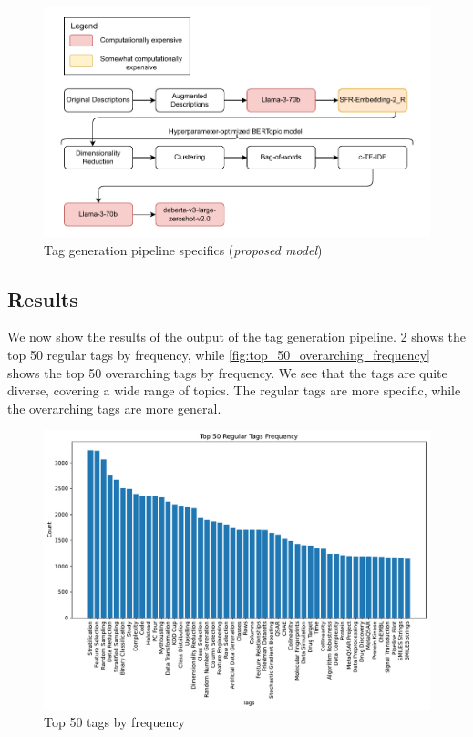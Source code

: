 \begin{figure}[h]
    \centering
    \includegraphics[width=\textwidth]{figures/tag_generation_pipeline_specifics.pdf}
    \caption{Tag generation pipeline specifics (\textit{proposed model})}
    \label{fig:tag_generation_pipeline_specifics}
\end{figure}

\subsection{Results}
We now show the results of the output of the tag generation pipeline. \cref{fig:top_50_frequency} shows the top 50 regular tags by frequency, while \cref{fig:top_50_overarching_frequency} shows the top 50 overarching tags by frequency. We see that the tags are quite diverse, covering a wide range of topics. The regular tags are more specific, while the overarching tags are more general.

\begin{figure}[h]
    \centering
    \includegraphics[width=\textwidth]{figures/top_50_frequency.pdf}
    \caption{Top 50 tags by frequency}
    \label{fig:top_50_frequency}
\end{figure}

